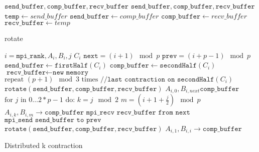 \begin{algorithm}[ht]
    \begin{algorithmic}
        \Require $\texttt{send\_buffer},\texttt{comp\_buffer},\texttt{recv\_buffer}$
        \Ensure $\texttt{send\_buffer},\texttt{comp\_buffer},\texttt{recv\_buffer}$
        \State $\texttt{temp} \gets {send\_buffer}$
        \State $\texttt{send\_buffer} \gets {comp\_buffer}$
        \State $\texttt{comp\_buffer} \gets {recv\_buffer}$
        \State $\texttt{recv\_buffer} \gets {temp}$
    \end{algorithmic}
    \caption{rotate}
    \label{rotate_pseudocode}
\end{algorithm}

\begin{algorithm}[ht]
    \begin{algorithmic}
    \Require $i = \texttt{mpi\_rank}, A_i, B_i, j$
    \Ensure $C_i$
    \State $\texttt{next} = (i+1) \mod p$
    \State $\texttt{prev} = (i+p-1) \mod p$
    \State $\texttt{send\_buffer} \gets \texttt{firstHalf}(C_i)$
    \State $\texttt{comp\_buffer} \gets \texttt{secondHalf}(C_i)$
    \State $\texttt{recv\_buffer} \gets \texttt{new memory}$
    \State $\text{repeat } (p+1) \mod 3 \text{ times} \texttt{ //last contraction on secondHalf}(C_i)$ 
    \State \indent $\texttt{rotate}(\texttt{send\_buffer},\texttt{comp\_buffer},\texttt{recv\_buffer})$
    \State $A_{i,0}, B_{i,next} \texttt{comp\_buffer}$
    \State  $\text{for } j \text{ in } 0\dots 2 * p - 1 \text{ do:}$
    \State \indent $ k = j \mod 2 $
    \State \indent $ m = (i + 1 + \frac{j}{2}) \mod p$
    \State \indent {}
    \State \indent \indent $A_{i,k}, B_{i,m} \rightarrow \texttt{comp\_buffer}$
    \State \indent \indent $\texttt{mpi\_recv recv\_buffer from next}$
    \State \indent \indent $\texttt{mpi\_send send\_buffer to prev}$
    \State \indent $\texttt{rotate}(\texttt{send\_buffer},\texttt{comp\_buffer},\texttt{recv\_buffer})$
    \State $A_{i,1}, B_{i,i} \rightarrow \texttt{comp\_buffer}$

\end{algorithmic}
\caption{Distributed k contraction}
\label{alg:k_pseudocode}
\end{algorithm}


